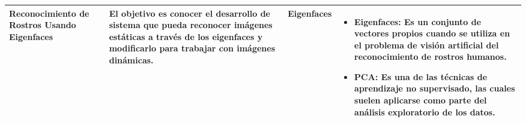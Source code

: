 \begin{longtable}{|m{3cm}|m{2.5cm}|m{2.5cm}|m{8.5cm}|}
\hline Reconocimiento de Rostros Usando Eigenfaces &  El objetivo es conocer el desarrollo de sistema que pueda reconocer imágenes estáticas a través de los eigenfaces y modificarlo para trabajar con imágenes dinámicas. & Eigenfaces &

\begin{itemize}

\item \textbf{Eigenfaces:}  Es un conjunto de vectores propios cuando se utiliza en el problema de visión artificial del reconocimiento de rostros humanos.

\item \textbf{PCA:} Es una de las técnicas de aprendizaje no supervisado, las cuales suelen aplicarse como parte del análisis exploratorio de los datos. 

\end{itemize} \\

\hline
\end{longtable}


\newpage
